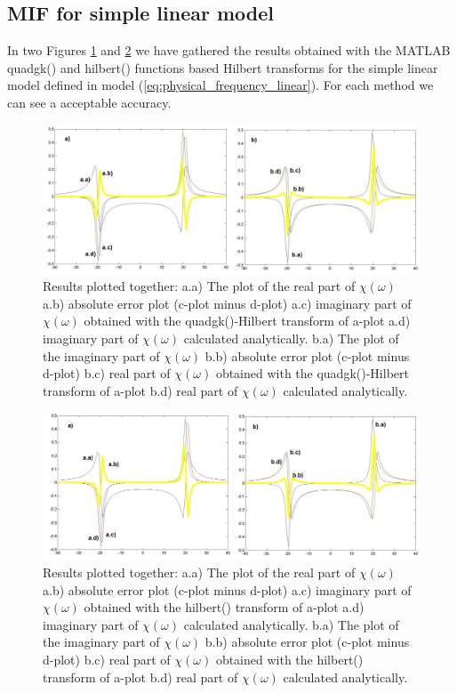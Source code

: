 \documentclass[12pt,twoside,a4paper]{article}
\numberwithin{equation}{subsection}
\numberwithin{figure}{subsection}
\begin{document}
\subsection{MIF for simple linear model} \label{chap:matlab_lin}

In two Figures \ref{fig:quadgk_lin} and \ref{fig:hilb_lin} we have ga\-thered the results ob\-tained with the MATLAB quadgk() and
hilbert() functions based Hil\-bert trans\-forms for the simple linear model defined in model (\ref{eq:physical_frequency_linear}).
For each method we can see a accep\-table accu\-racy.

\begin{figure} 
  \includegraphics[width=150mm]{img/quadgk_lin.png}
  \caption{Results plotted together: 
   a.a) The plot of the real part of $\chi (\omega )$ 
   a.b) absolute error plot (c-plot minus d-plot) 
   a.c) imaginary part of $\chi (\omega )$ obtained with the quadgk()-Hilbert transform of a-plot 
   a.d) imaginary part of $\chi (\omega )$  calculated analytically. 
   b.a) The plot of the imaginary part of $\chi (\omega )$ 
   b.b) absolute error plot (c-plot minus d-plot) 
   b.c) real part of $\chi (\omega )$ obtained with the quadgk()-Hilbert transform of a-plot 
   b.d) real part of $\chi (\omega )$ calculated analytically. \label{fig:quadgk_lin}
  }
\end{figure}

\begin{figure} 
  \includegraphics[width=150mm]{img/hilb_lin.png}
  \caption{Results plotted together: 
   a.a) The plot of the real part of $\chi (\omega )$ 
   a.b) absolute error plot (c-plot minus d-plot) 
   a.c) imaginary part of $\chi (\omega )$ obtained with the hilbert() transform of a-plot 
   a.d) imaginary part of $\chi (\omega )$  calculated analytically. 
   b.a) The plot of the imaginary part of $\chi (\omega )$ 
   b.b) absolute error plot (c-plot minus d-plot) 
   b.c) real part of $\chi (\omega )$ obtained with the hilbert() transform of a-plot 
   b.d) real part of $\chi (\omega )$ calculated analytically. \label{fig:hilb_lin}
  }
\end{figure}
\end{document}
